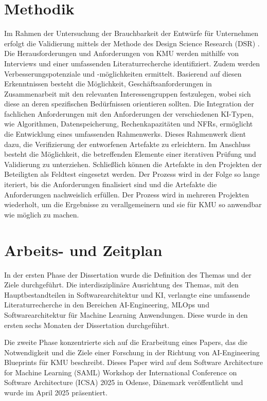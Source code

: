 \documentclass[11pt,a4paper,pointlessnumbers]{scrartcl}
\theoremstyle{break}
\numberwithin{equation}{section}
\begin{document}
\section{Methodik}
Im Rahmen der Untersuchung der Brauchbarkeit der Entwürfe für Unternehmen erfolgt die Validierung mittels der Methode des Design Science Research (DSR) \cite{hevnerDesignScienceInformation2004a, ivarssonMethodEvaluatingRigor2011}. Die Herausforderungen und Anforderungen von KMU werden mithilfe von Interviews und einer umfassenden Literaturrecherche identifiziert. Zudem werden Verbesserungspotenziale und -möglichkeiten ermittelt.  Basierend auf diesen Erkenntnissen besteht die Möglichkeit, Geschäftsanforderungen in Zusammenarbeit mit den relevanten Interessengruppen festzulegen, wobei sich diese an deren spezifischen Bedürfnissen orientieren sollten. Die Integration der fachlichen Anforderungen mit den Anforderungen der verschiedenen KI-Typen, wie Algorithmen, Datenspeicherung, Rechenkapazitäten und NFRs, ermöglicht die Entwicklung eines umfassenden Rahmenwerks. Dieses Rahmenwerk dient dazu, die Verifizierung der entworfenen Artefakte zu erleichtern. Im Anschluss besteht die Möglichkeit, die betreffenden Elemente einer iterativen Prüfung und Validierung zu unterziehen. Schließlich können die Artefakte in den Projekten der Beteiligten als Feldtest eingesetzt werden. Der Prozess wird in der Folge so lange iteriert, bis die Anforderungen finalisiert sind und die Artefakte die Anforderungen nachweislich erfüllen. Der Prozess wird in mehreren Projekten wiederholt, um die Ergebnisse zu verallgemeinern und sie für KMU so anwendbar wie möglich zu machen.

\section{Arbeits- und Zeitplan}
In der ersten Phase der Dissertation wurde die Definition des Themas und der Ziele durchgeführt. Die interdisziplinäre Ausrichtung des Themas, mit den Hauptbestandteilen in Softwarearchitektur und KI, verlangte eine umfassende Literaturrecherche in den Bereichen AI-Engineering, MLOps und Softwarearchitektur für Machine Learning Anwendungen. Diese wurde in den ersten sechs Monaten der Dissertation durchgeführt. 

Die zweite Phase konzentrierte sich auf die Erarbeitung eines Papers, das die Notwendigkeit und die Ziele einer Forschung in der Richtung von AI-Engineering Blueprints für KMU beschreibt. Dieses Paper wird auf dem Software Architecture for Machine Learning (SAML) Workshop der International Conference on Software Architecture (ICSA) 2025 in Odense, Dänemark veröffentlicht und wurde im April 2025 präsentiert.   
\end{document}
